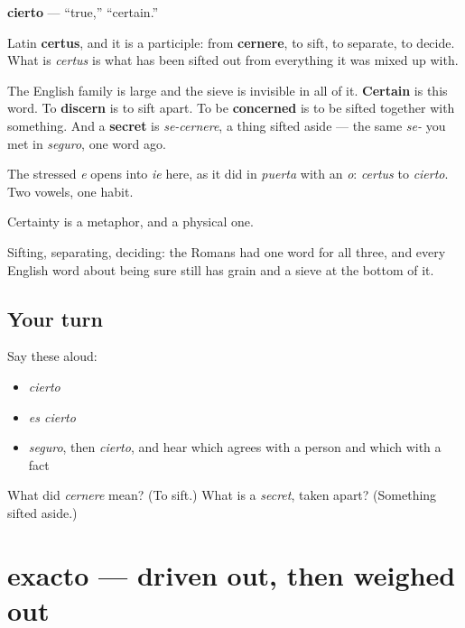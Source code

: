 \begin{cousinweb}
\textbf{cierto} — \textquotedblleft{}true,\textquotedblright{} \textquotedblleft{}certain.\textquotedblright{}

Latin \textbf{certus}, and it is a participle: from \textbf{cernere}, to sift, to separate, to decide. What is \emph{certus} is what has been sifted out from everything it was mixed up with.

The English family is large and the sieve is invisible in all of it. \textbf{Certain} is this word. To \textbf{discern} is to sift apart. To be \textbf{concerned} is to be sifted together with something. And a \textbf{secret} is \emph{se-cernere}, a thing sifted aside — the same \emph{se-} you met in \emph{seguro}, one word ago.

The stressed \emph{e} opens into \emph{ie} here, as it did in \emph{puerta} with an \emph{o}: \emph{certus} to \emph{cierto}. Two vowels, one habit.
\end{cousinweb}

\begin{grammarlens}[title={What you've built}]
Certainty is a metaphor, and a physical one.

Sifting, separating, deciding: the Romans had one word for all three, and every English word about being sure still has grain and a sieve at the bottom of it.
\end{grammarlens}

\subsection*{Your turn}
Say these aloud:

\begin{itemize}
\raggedright
  \item \emph{cierto}
  \item \emph{es cierto}
  \item \emph{seguro}, then \emph{cierto}, and hear which agrees with a person and which with a fact
\end{itemize}

\begin{tcolorbox}[breakable,colback=teal!4,colframe=teal!35!black,title={Before you move on}]
What did \emph{cernere} mean? (To sift.) What is a \emph{secret}, taken apart? (Something sifted aside.)
\end{tcolorbox}
\section[exacto]{exacto — driven out, then weighed out}

